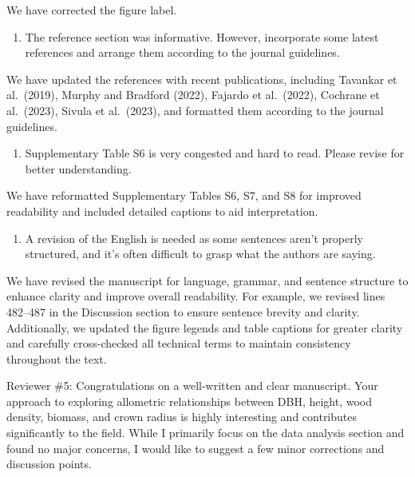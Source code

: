 \documentclass[
  12pt,
  letterpaper,
  DIV=11,
  numbers=noendperiod]{scrartcl}
\providecommand{\tightlist}{%
  \setlength{\itemsep}{0pt}\setlength{\parskip}{0pt}}\usepackage{longtable,booktabs,array}
\renewenvironment{quote}
  {\begin{customblockquote}\color{blockquote-text}\ignorespaces}
  {\end{customblockquote}}
\begin{document}
We have corrected the figure label.

\begin{quote}
\begin{enumerate}
\def\labelenumi{\arabic{enumi})}
\setcounter{enumi}{6}
\tightlist
\item
  The reference section was informative. However, incorporate some
  latest references and arrange them according to the journal
  guidelines.
\end{enumerate}
\end{quote}

We have updated the references with recent publications, including
Tavankar et al.~(2019), Murphy and Bradford (2022), Fajardo et
al.~(2022), Cochrane et al.~(2023), Sivula et al.~(2023), and formatted
them according to the journal guidelines.

\begin{quote}
\begin{enumerate}
\def\labelenumi{\arabic{enumi})}
\setcounter{enumi}{7}
\tightlist
\item
  Supplementary Table S6 is very congested and hard to read. Please
  revise for better understanding.
\end{enumerate}
\end{quote}

We have reformatted Supplementary Tables S6, S7, and S8 for improved
readability and included detailed captions to aid interpretation.

\begin{quote}
\begin{enumerate}
\def\labelenumi{\arabic{enumi})}
\setcounter{enumi}{8}
\tightlist
\item
  A revision of the English is needed as some sentences aren't properly
  structured, and it's often difficult to grasp what the authors are
  saying.
\end{enumerate}
\end{quote}

We have revised the manuscript for language, grammar, and sentence
structure to enhance clarity and improve overall readability. For
example, we revised lines 482--487 in the Discussion section to ensure
sentence brevity and clarity. Additionally, we updated the figure
legends and table captions for greater clarity and carefully
cross-checked all technical terms to maintain consistency throughout the
text.

\begin{quote}
Reviewer \#5: Congratulations on a well-written and clear manuscript.
Your approach to exploring allometric relationships between DBH, height,
wood density, biomass, and crown radius is highly interesting and
contributes significantly to the field. While I primarily focus on the
data analysis section and found no major concerns, I would like to
suggest a few minor corrections and discussion points.
\end{quote}
\end{document}
